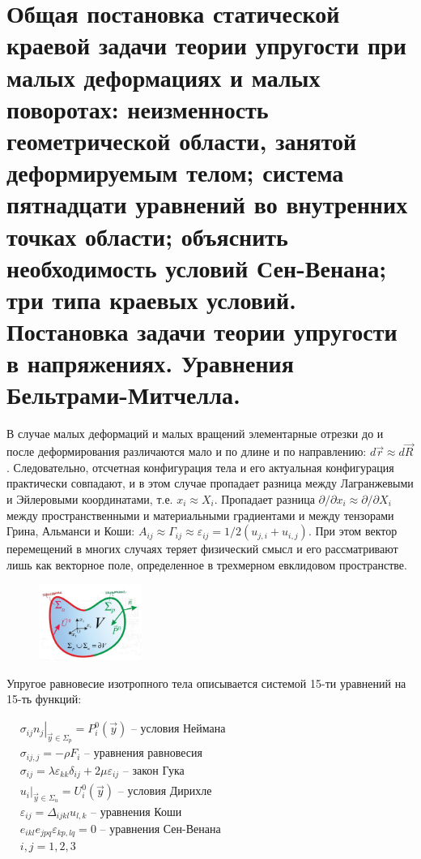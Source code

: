 \section{Общая постановка статической краевой задачи теории упругости при малых деформациях и малых поворотах: неизменность геометрической области, занятой деформируемым телом; система пятнадцати уравнений во внутренних точках области; объяснить необходимость условий Сен-Венана; три типа краевых условий. Постановка задачи теории упругости в напряжениях. Уравнения Бельтрами-Митчелла.}


В случае малых деформаций и малых вращений элементарные отрезки до и после деформирования различаются мало и по длине и по направлению: $d \vec{r} \approx d \vec{R}$. Следовательно, отсчетная конфигурация тела и его актуальная конфигурация практически совпадают, и в этом случае пропадает разница между Лагранжевыми и Эйлеровыми координатами, т.е. $x_i \approx X_i$. Пропадает разница $\partial / \partial x_i \approx \partial / \partial X_i$ между пространственными и материальными градиентами и между тензорами Грина, Альманси и Коши: $A_{i j} \approx \Gamma_{i j} \approx \varepsilon_{i j}=1 / 2\left(u_{j, i}+u_{i, j}\right)$. При этом вектор перемещений в многих случаях теряет физический смысл и его рассматривают лишь как векторное поле, определенное в трехмерном евклидовом пространстве.

\begin{figure}[h!]
  \centering
  \includegraphics[width=0.3\textwidth]{images/13.1.jpg}
\end{figure}



Упругое равновесие изотропного тела описывается системой 15-ти уравнений на 15-ть функций:


$\begin{aligned} & \left.\sigma_{i j} n_j\right|_{\vec{y} \in \Sigma_p}=P_i^0(\vec{y})  \text{ -- условия Неймана} \\ &
 \sigma_{i j, j}=-\rho F_i \text{ -- уравнения равновесия} \\ &
\sigma_{i j}=\lambda \varepsilon_{k k} \delta_{i j}+2 \mu \varepsilon_{i j} \text{ --  закон Гука} \\ & 
\left.u_i\right|_{\vec{y} \in \Sigma_u}=U_i^0(\vec{y}) \text{ -- условия Дирихле} \\ &
 \varepsilon_{i j}=\Delta_{i j k l} u_{l, k} \text{ -- уравнения Коши}  \\ &
 e_{i k l} e_{j p q} \varepsilon_{k p, l q}=0 \text{ -- уравнения Сен-Венана}\\ &
 i, j=1,2,3 
 \end{aligned}$


